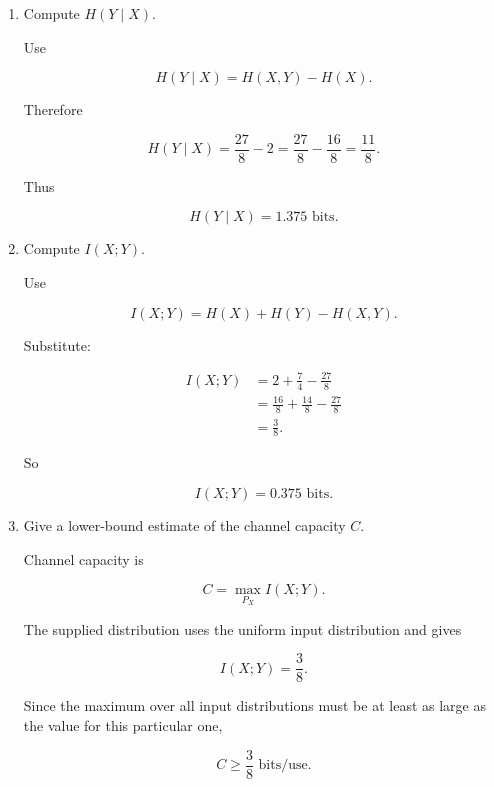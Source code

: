 \documentclass[11pt]{article}
\begin{document}
\begin{enumerate}
The nonzero probabilities in the table are:

\[
1\times\frac14,
\qquad
2\times\frac18,
\qquad
6\times\frac1{16},
\qquad
4\times\frac1{32}.
\]

Therefore

\begin{align*}
H(X,Y)
&=
-\frac14\log_2\frac14
-2\left(\frac18\log_2\frac18\right) \\
&\qquad
-6\left(\frac1{16}\log_2\frac1{16}\right)
-4\left(\frac1{32}\log_2\frac1{32}\right).
\end{align*}

Compute each piece:

\[
-\frac14\log_2\frac14
=
\frac12,
\]

\[
-2\left(\frac18\log_2\frac18\right)
=
2\left(\frac38\right)
=
\frac34,
\]

\[
-6\left(\frac1{16}\log_2\frac1{16}\right)
=
6\left(\frac4{16}\right)
=
\frac32,
\]

and

\[
-4\left(\frac1{32}\log_2\frac1{32}\right)
=
4\left(\frac5{32}\right)
=
\frac58.
\]

Hence

\[
H(X,Y)
=
\frac12+\frac34+\frac32+\frac58
=
\frac{27}{8}
=
3.375\text{ bits}.
\]

\item Compute \(H(Y\mid X)\).

Use

\[
H(Y\mid X)
=
H(X,Y)-H(X).
\]

Therefore

\[
H(Y\mid X)
=
\frac{27}{8}-2
=
\frac{27}{8}-\frac{16}{8}
=
\frac{11}{8}.
\]

Thus

\[
H(Y\mid X)=1.375\text{ bits}.
\]

\item Compute \(I(X;Y)\).

Use

\[
I(X;Y)
=
H(X)+H(Y)-H(X,Y).
\]

Substitute:

\begin{align*}
I(X;Y)
&=
2+\frac74-\frac{27}{8} \\
&=
\frac{16}{8}+\frac{14}{8}-\frac{27}{8} \\
&=
\frac38.
\end{align*}

So

\[
I(X;Y)=0.375\text{ bits}.
\]

\item Give a lower-bound estimate of the channel capacity \(C\).

Channel capacity is

\[
C
=
\max_{P_X} I(X;Y).
\]

The supplied distribution uses the uniform input distribution and gives

\[
I(X;Y)=\frac38.
\]

Since the maximum over all input distributions must be at least as large as
the value for this particular one,

\[
C\geq\frac38\text{ bits/use}.
\]

\end{enumerate}
\end{document}
